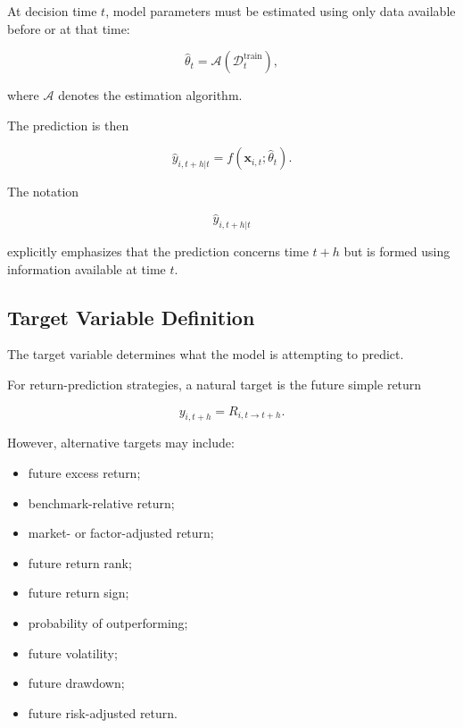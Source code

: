 \documentclass[11pt,a4paper]{article}
\begin{document}
At decision time $t$, model parameters must be estimated using only data
available before or at that time:

\begin{equation}
\widehat{\theta}_t
=
\mathcal{A}
\left(
\mathcal{D}_t^{\mathrm{train}}
\right),
\end{equation}

where $\mathcal{A}$ denotes the estimation algorithm.

The prediction is then

\begin{equation}
\boxed{
\widehat{y}_{i,t+h|t}
=
f
\left(
\mathbf{x}_{i,t};
\widehat{\theta}_t
\right).
}
\end{equation}

The notation

\begin{equation}
\widehat{y}_{i,t+h|t}
\end{equation}

explicitly emphasizes that the prediction concerns time $t+h$ but is formed
using information available at time $t$.


\subsection{Target Variable Definition}
\label{subsec:model_target_variable}

The target variable determines what the model is attempting to predict.

For return-prediction strategies, a natural target is the future simple return

\begin{equation}
\boxed{
y_{i,t+h}
=
R_{i,t\rightarrow t+h}.
}
\end{equation}

However, alternative targets may include:

\begin{itemize}
    \item future excess return;
    \item benchmark-relative return;
    \item market- or factor-adjusted return;
    \item future return rank;
    \item future return sign;
    \item probability of outperforming;
    \item future volatility;
    \item future drawdown;
    \item future risk-adjusted return.
\end{itemize}
\end{document}
